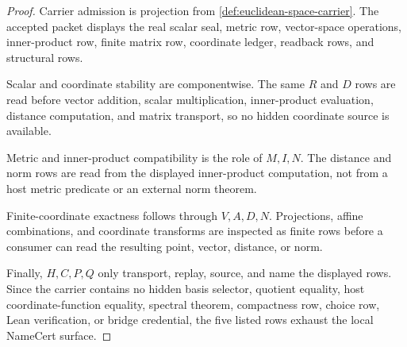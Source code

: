 \begin{proof}
Carrier admission is projection from \autoref{def:euclidean-space-carrier}. The accepted packet displays the real scalar seal, metric row, vector-space operations, inner-product row, finite matrix row, coordinate ledger, readback rows, and structural rows.

Scalar and coordinate stability are componentwise. The same $R$ and $D$ rows are read before vector addition, scalar multiplication, inner-product evaluation, distance computation, and matrix transport, so no hidden coordinate source is available.

Metric and inner-product compatibility is the role of $M,I,N$. The distance and norm rows are read from the displayed inner-product computation, not from a host metric predicate or an external norm theorem.

Finite-coordinate exactness follows through $V,A,D,N$. Projections, affine combinations, and coordinate transforms are inspected as finite rows before a consumer can read the resulting point, vector, distance, or norm.

Finally, $H,C,P,Q$ only transport, replay, source, and name the displayed rows. Since the carrier contains no hidden basis selector, quotient equality, host coordinate-function equality, spectral theorem, compactness row, choice row, Lean verification, or bridge credential, the five listed rows exhaust the local NameCert surface.
\end{proof}

